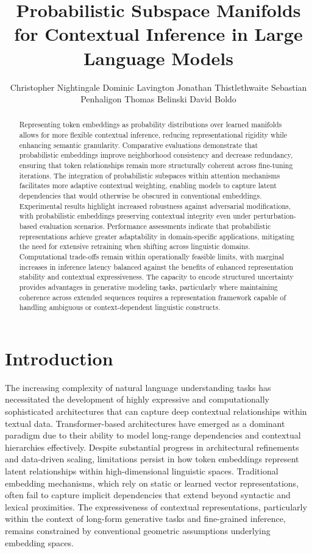 \documentclass{article}
\title{Probabilistic Subspace Manifolds for Contextual Inference in Large Language Models}
\author{
  Christopher Nightingale \And Dominic Lavington \And Jonathan Thistlethwaite \And Sebastian Penhaligon \And Thomas Belinski \And David Boldo
}
\begin{document}
\maketitle


\begin{abstract}
Representing token embeddings as probability distributions over learned manifolds allows for more flexible contextual inference, reducing representational rigidity while enhancing semantic granularity. Comparative evaluations demonstrate that probabilistic embeddings improve neighborhood consistency and decrease redundancy, ensuring that token relationships remain more structurally coherent across fine-tuning iterations. The integration of probabilistic subspaces within attention mechanisms facilitates more adaptive contextual weighting, enabling models to capture latent dependencies that would otherwise be obscured in conventional embeddings. Experimental results highlight increased robustness against adversarial modifications, with probabilistic embeddings preserving contextual integrity even under perturbation-based evaluation scenarios. Performance assessments indicate that probabilistic representations achieve greater adaptability in domain-specific applications, mitigating the need for extensive retraining when shifting across linguistic domains. Computational trade-offs remain within operationally feasible limits, with marginal increases in inference latency balanced against the benefits of enhanced representation stability and contextual expressiveness. The capacity to encode structured uncertainty provides advantages in generative modeling tasks, particularly where maintaining coherence across extended sequences requires a representation framework capable of handling ambiguous or context-dependent linguistic constructs.
\end{abstract}

\section{Introduction}

The increasing complexity of natural language understanding tasks has necessitated the development of highly expressive and computationally sophisticated architectures that can capture deep contextual relationships within textual data. Transformer-based architectures have emerged as a dominant paradigm due to their ability to model long-range dependencies and contextual hierarchies effectively. Despite substantial progress in architectural refinements and data-driven scaling, limitations persist in how token embeddings represent latent relationships within high-dimensional linguistic spaces. Traditional embedding mechanisms, which rely on static or learned vector representations, often fail to capture implicit dependencies that extend beyond syntactic and lexical proximities. The expressiveness of contextual representations, particularly within the context of long-form generative tasks and fine-grained inference, remains constrained by conventional geometric assumptions underlying embedding spaces.
\end{document}
